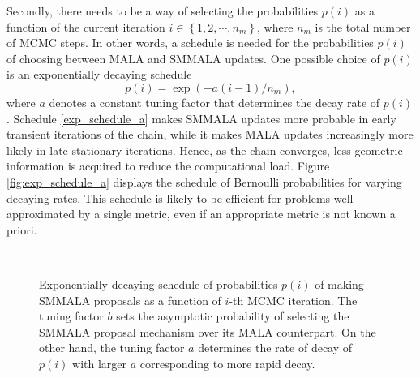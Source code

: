 \documentclass[twoside,11pt]{article}
\begin{document}
Secondly, there needs to be a way of selecting the probabilities $p(i)$ as a function of the current iteration
$i\in\left\{1,2,\cdots,n_m\right\}$, where $n_m$ is the total number of MCMC steps. In other words, a schedule is needed for
the probabilities $p(i)$ of choosing between MALA and SMMALA updates. One possible choice of $p(i)$ is an exponentially 
decaying schedule
\begin{equation}
\label{exp_schedule_a}
p(i)=\exp{(-a(i-1)/n_m)},
\end{equation}
where $a$ denotes a constant tuning factor that determines the decay rate of $p(i)$.
Schedule \eqref{exp_schedule_a} makes SMMALA updates more probable in early transient iterations of the chain, while it 
makes MALA updates increasingly more likely in late stationary iterations. Hence, as the chain converges, less geometric 
information is acquired to reduce the computational load. Figure \ref{fig:exp_schedule_a} displays the schedule of Bernoulli 
probabilities for varying decaying rates.  This schedule is likely to be efficient for problems well approximated by a 
single metric, even if an appropriate metric is not known a priori.

\begin{figure}[t]
	\centering
	 \\
	\caption{Exponentially decaying schedule of probabilities $p(i)$ of making SMMALA proposals as a function of
	$i$-th MCMC iteration. The tuning factor $b$ sets the asymptotic probability of selecting the SMMALA proposal mechanism
	over its MALA counterpart. On the other hand, the tuning factor $a$ determines the rate of decay of $p(i)$ with larger 
	$a$ corresponding to more rapid decay.
	}
	\label{fig:exp_schedule}
\end{figure}
\end{document}
